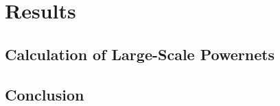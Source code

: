 \chapter{Results}

\section{Calculation of Large-Scale Powernets}
\label{sec:large_scale_powernets}

\section{Conclusion}